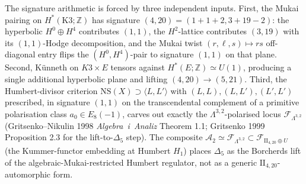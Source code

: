 \begin{remark}
\label{rem:qgfnd-humbert-regulator-algebraic-mukai}
The signature arithmetic is forced by three independent inputs. First,
the Mukai pairing on $H^*(\mathrm{K3};\mathbb Z)$ has signature
$(4,20)=(1+1+2,3+19-2)$: the hyperbolic $H^0\oplus H^4$ contributes
$(1,1)$, the $H^2$-lattice contributes $(3,19)$ with its $(1,1)$-Hodge
decomposition, and the Mukai twist $(r,\ell,s)\mapsto r s$ off-diagonal
entry flips the $(H^0,H^4)$-pair to signature $(1,1)$ on that plane.
Second, Künneth on $K3\times E$ tensors against
$H^*(E;\mathbb Z)\simeq U(1)$, producing a single additional hyperbolic
plane and lifting $(4,20)\to(5,21)$. Third, the Humbert-divisor
criterion $\mathrm{NS}(X)\supset\langle L,L'\rangle$ with
$(L,L),(L,L'),(L',L')$ prescribed, in signature $(1,1)$ on the
transcendental complement of a primitive polarisation class
$a_0\in E_8(-1)$, carves out exactly the $\Lambda^{3,2}$-polarised
locus $\mathcal F_{\Lambda^{3,2}}$ (Gritsenko--Nikulin 1998
\emph{Algebra~i~Analiz} Theorem 1.1; Gritsenko 1999 Proposition 2.3
for the lift-to-$\Delta_5$ step). The composite
$\mathcal A_2\simeq\mathcal F_{\Lambda^{3,2}}\subset\mathcal F_{\mathrm{II}_{4,20}\oplus U}$
(the Kummer-functor embedding at Humbert $H_1$) places $\Delta_5$ as
the Borcherds lift of the algebraic-Mukai-restricted Humbert
regulator, not as a generic $\mathrm{II}_{4,20}$-automorphic form.


\end{remark}

